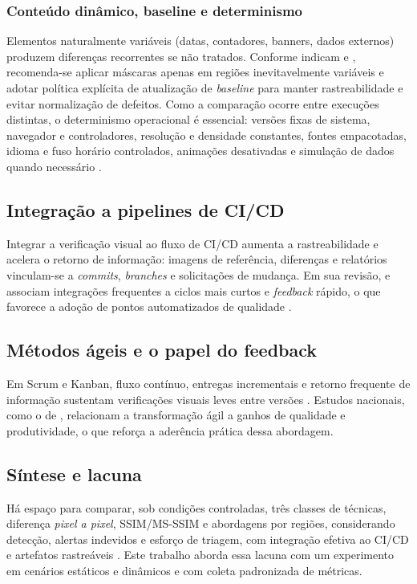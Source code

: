 \documentclass{UNESC}
\begin{document}
\subsubsection{Conteúdo dinâmico, baseline e determinismo}
Elementos naturalmente variáveis (datas, contadores, banners, dados externos) produzem diferenças recorrentes se não tratados. Conforme indicam  e , recomenda-se aplicar máscaras apenas em regiões inevitavelmente variáveis e adotar política explícita de atualização de \emph{baseline} para manter rastreabilidade e evitar normalização de defeitos. Como a comparação ocorre entre execuções distintas, o determinismo operacional é essencial: versões fixas de sistema, navegador e controladores, resolução e densidade constantes, fontes empacotadas, idioma e fuso horário controlados, animações desativadas e simulação de dados quando necessário \cite{heinonen2020}.

\subsection{Integração a pipelines de CI/CD}

Integrar a verificação visual ao fluxo de CI/CD aumenta a rastreabilidade e acelera o retorno de informação: imagens de referência, diferenças e relatórios vinculam-se a \emph{commits}, \emph{branches} e solicitações de mudança. Em sua revisão,  e  associam integrações frequentes a ciclos mais curtos e \emph{feedback} rápido, o que favorece a adoção de pontos automatizados de qualidade \cite{maia2024}.

\subsection{Métodos ágeis e o papel do feedback}

Em Scrum e Kanban, fluxo contínuo, entregas incrementais e retorno frequente de informação sustentam verificações visuais leves entre versões \cite{bessa2018}. Estudos nacionais, como o de , relacionam a transformação ágil a ganhos de qualidade e produtividade, o que reforça a aderência prática dessa abordagem.

\subsection{Síntese e lacuna}

Há espaço para comparar, sob condições controladas, três classes de técnicas, diferença \emph{pixel a pixel}, SSIM/MS-SSIM e abordagens por regiões, considerando detecção, alertas indevidos e esforço de triagem, com integração efetiva ao CI/CD e artefatos rastreáveis \cite{tanno2020,wang2004,wang2003msssim,heinonen2020}. Este trabalho aborda essa lacuna com um experimento em cenários estáticos e dinâmicos e com coleta padronizada de métricas.
\end{document}
